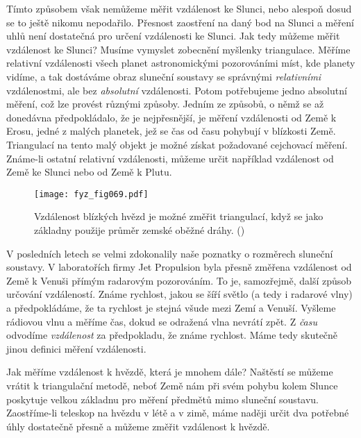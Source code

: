    Tímto způsobem však nemůžeme měřit vzdálenost ke Slunci, nebo alespoň dosud se to ještě nikomu 
    nepodařilo. Přesnost zaostření na daný bod na Slunci a měření uhlů není dostatečná pro určení 
    vzdálenosti ke Slunci. Jak tedy můžeme měřit vzdálenost ke Slunci? Musíme vymyslet zobecnění 
    myšlenky triangulace. Měříme relativní vzdálenosti všech planet astronomickými pozorováními 
    míst, kde planety vidíme, a tak dostáváme obraz sluneční soustavy se správnými 
    \emph{relativními} vzdálenostmi, ale bez \emph{absolutní} vzdálenosti. Potom potřebujeme jedno 
    absolutní měření, což lze provést různými způsoby. Jedním ze způsobů, o němž se až donedávna 
    předpokládalo, že je nejpřesnější, je měření vzdálenosti od Země k Erosu, jedné z malých 
    planetek, jež se čas od času pohybují v blízkosti Země. Triangulací na tento malý objekt je 
    možné získat požadované cejchovací měření. Známe-li ostatní relativní vzdálenosti, můžeme určit 
    například vzdálenost od Země ke Slunci nebo od Země k Plutu.
    
    \begin{figure}[ht!]  %
      \centering
      \texttt{[image: fyz\_fig069.pdf]}
      \caption{Vzdálenost blízkých hvězd je možné změřit triangulací, když se jako základny použije 
               průměr zemské oběžné dráhy. (\cite[s.~71]{Feynman01})}
      \label{fyz:fig069}
    \end{figure}     
    V posledních letech se velmi zdokonalily naše poznatky o rozměrech sluneční soustavy. V 
    laboratořích firmy Jet Propulsion byla přesně změřena vzdálenost od Země k Venuši přímým 
    radarovým pozorováním. To je, samozřejmě, další způsob určování vzdáleností. Známe rychlost, 
    jakou se šíří světlo (a tedy i radarové vlny) a předpokládáme, že ta rychlost je stejná všude 
    mezi Zemí a Venuší. Vyšleme rádiovou vlnu a měříme čas, dokud se odražená vlna nevrátí zpět. Z 
    \emph{času} odvodíme \emph{vzdálenost} za předpokladu, že známe rychlost. Máme tedy skutečně 
    jinou definici měření vzdálenosti.
    
    Jak měříme vzdálenost k hvězdě, která je mnohem dále? Naštěstí se můžeme vrátit k triangulační 
    metodě, neboť Země nám při svém pohybu kolem Slunce poskytuje velkou základnu pro měření 
    předmětů mimo sluneční soustavu. Zaostříme-li teleskop na hvězdu v létě a v zimě, máme naději 
    určit dva potřebné úhly dostatečně přesně a můžeme změřit vzdálenost k hvězdě.
   
